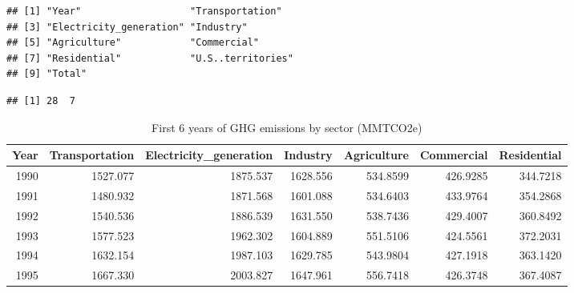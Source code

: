 \documentclass[12pt,]{article}
\newenvironment{Shaded}{\begin{snugshade}}{\end{snugshade}}
\newcommand{\KeywordTok}[1]{\textcolor[rgb]{0.13,0.29,0.53}{\textbf{#1}}}
\newcommand{\StringTok}[1]{\textcolor[rgb]{0.31,0.60,0.02}{#1}}
\newcommand{\CommentTok}[1]{\textcolor[rgb]{0.56,0.35,0.01}{\textit{#1}}}
\newcommand{\OperatorTok}[1]{\textcolor[rgb]{0.81,0.36,0.00}{\textbf{#1}}}
\newcommand{\NormalTok}[1]{#1}
\begin{document}
\begin{Shaded}
\end{Shaded}

\begin{verbatim}
## [1] "Year"                   "Transportation"        
## [3] "Electricity_generation" "Industry"              
## [5] "Agriculture"            "Commercial"            
## [7] "Residential"            "U.S..territories"      
## [9] "Total"
\end{verbatim}

\begin{Shaded}
\end{Shaded}

\begin{verbatim}
## [1] 28  7
\end{verbatim}

\begin{table}[!h]

\caption{\label{tab:unnamed-chunk-9}First 6 years of GHG emissions by sector (MMTCO2e)}
\centering
\begin{tabular}{r|r|r|r|r|r|r}
\hline
Year & Transportation & Electricity\_generation & Industry & Agriculture & Commercial & Residential\\
\hline
1990 & 1527.077 & 1875.537 & 1628.556 & 534.8599 & 426.9285 & 344.7218\\
\hline
1991 & 1480.932 & 1871.568 & 1601.088 & 534.6403 & 433.9764 & 354.2868\\
\hline
1992 & 1540.536 & 1886.539 & 1631.550 & 538.7436 & 429.4007 & 360.8492\\
\hline
1993 & 1577.523 & 1962.302 & 1604.889 & 551.5106 & 424.5561 & 372.2031\\
\hline
1994 & 1632.154 & 1987.103 & 1629.785 & 543.9804 & 427.1918 & 363.1420\\
\hline
1995 & 1667.330 & 2003.827 & 1647.961 & 556.7418 & 426.3748 & 367.4087\\
\hline
\end{tabular}
\end{table}
\end{document}
